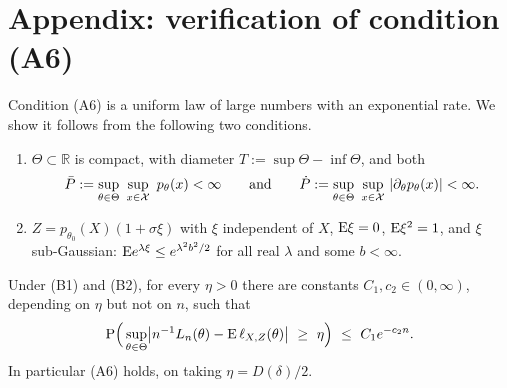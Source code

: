 \section{Appendix: verification of condition (A6)}
\label{sec:appendix-a6}

Condition (A6) is a uniform law of large numbers with an exponential rate. We show it follows from the following two conditions.

\begin{enumerate}
	\item[(B1)] $\Theta\subset\mathbb{R}$ is compact, with diameter $T:=\sup\Theta-\inf\Theta$, and both
	$$
	\bar P:=\sup_{\theta\in\Theta}\ \sup_{x\in\mathcal{X}}\ p_{\theta}(x)<\infty
	\qquad\text{and}\qquad
	\dot P:=\sup_{\theta\in\Theta}\ \sup_{x\in\mathcal{X}}\ \abs*{\partial_{\theta}p_{\theta}(x)}<\infty .
	$$
	\item[(B2)] $Z=p_{\theta_{0}}(X)(1+\sigma\xi)$ with $\xi$ independent of $X$, $\mathrm{E}\xi=0$, $\mathrm{E}\xi^{2}=1$, and $\xi$ sub-Gaussian: $\mathrm{E} e^{\lambda\xi}\le e^{\lambda^{2}b^{2}/2}$ for all real $\lambda$ and some $b<\infty$.
\end{enumerate}

\begin{lemma}
\label{lem:a6}
Under (B1) and (B2), for every $\eta>0$ there are constants $C_1,c_2\in(0,\infty)$, depending on $\eta$ but not on $n$, such that
$$
\Prob\Big(\sup_{\theta\in\Theta}\abs*{n^{-1}L_n(\theta)-\E\,\ell_{X,Z}(\theta)}\ \ge\ \eta\Big)\ \le\ C_1 e^{-c_2 n}.
$$
In particular (A6) holds, on taking $\eta=D(\delta)/2$.
\end{lemma}

